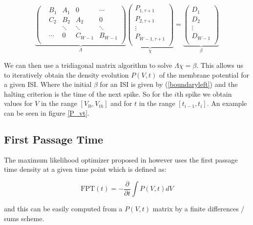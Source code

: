 \documentclass[10pt]{article}
\begin{document}
\begin{equation}
\underbrace{
\begin{pmatrix}
    & B_1   & A_1    & 0      & \cdots   \\
    & C_2   & B_2    & A_2    & 0        \\
    &       & \ddots & \ddots & \ddots   \\
    & \cdots & 0      & C_{W-1}& B_{W-1} \\
\end{pmatrix}}_{\Lambda}
\underbrace{
\begin{pmatrix}
    P_{1,\tau+1}   \\
    P_{2,\tau+1}   \\
    \vdots         \\
    P_{W-1,\tau+1} \\
\end{pmatrix}}_{\chi}
=
\underbrace{
\begin{pmatrix}
    D_1     \\
    D_2     \\
    \vdots  \\
    D_{W-1} \\
\end{pmatrix}}_{\beta}
\end{equation}

We can then use a tridiagonal matrix algorithm to solve $\Lambda \chi
= \beta$. This allows us to iteratively obtain the density evolution $P(V,t)$ of the
membrane potential for a given ISI. Where the initial $\beta$ for an ISI is given by
(\ref{boundaryleft}) and the halting criterion is the time of the next
spike. So for the $i$th spike we obtain values for $V$ in the range
$[V_{lb}, V_{th}]$ and for $t$ in the range $[t_{i-1},t_{i}]$. An
example can be seen in figure \ref{P_vt}.


\subsection{First Passage Time}

The maximum likelihood optimizer proposed in
\cite{PaninskiPillowSimoncelli} however uses the first passage time
density at a given time point which is defined as:

\begin{equation}
    \mathrm{FPT}(t)  = -\frac{\partial}{\partial t} \int P(V,t)dV 
    \label{eq:fpt}
\end{equation}

and this can be easily computed from a $P(V,t)$ matrix by a finite differences
/ sums scheme.
\end{document}
